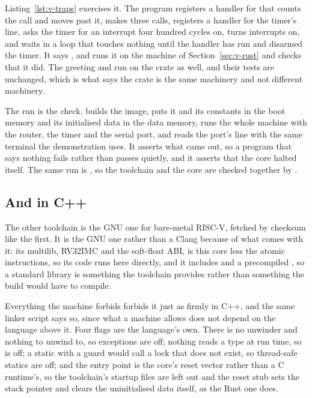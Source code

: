 \documentclass[journal,onecolumn,9pt]{IEEEtran}
\begin{document}
Listing~\ref{lst:v-traps} exercises it. The program registers a
handler for  that counts the call and moves 
past it, makes three calls, registers a handler for the timer's line,
asks the timer for an interrupt four hundred cycles on, turns
interrupts on, and waits in a loop that touches nothing until the
handler has run and disarmed the timer. It says
, and  runs it
on the machine of Section~\ref{sec:v-rust} and checks that it did.
The greeting and  run on the crate as well, and their
tests are unchanged, which is what says the crate is the same
machinery and not different machinery.



The run is the check.  builds the image,
puts it and its constants in the boot memory and its initialised data
in the data memory, runs the whole machine with the router, the timer and
the serial port, and reads the port's line with the same terminal the
demonstration uses. It asserts what came out, so a program that says
nothing fails rather than passes quietly, and it asserts that the
core halted itself. The same run is ,
so the toolchain and the core are checked together by
.

\subsection*{And in C++}

The other toolchain is the GNU one for bare-metal RISC-V, fetched by
checksum like the first. It is the GNU one rather than a Clang
because of what comes with it: its  multilib,
RV32IMC and the soft-float ABI, is this core less the atomic
instructions, so its code runs here directly, and it includes
 and a precompiled ,
so a standard library is something the
toolchain provides rather than something the build would have to compile.

Everything the machine forbids forbids it just as firmly in C++, and
the same linker script says so, since what a machine allows does not
depend on the language above it. Four flags are the language's own.
There is no unwinder and nothing to unwind to, so exceptions are off;
nothing reads a type at run time, so  is off; a static
with a guard would call a lock that does not exist, so thread-safe
statics are off; and the entry point is the core's reset vector
rather than a C runtime's, so the toolchain's startup files are left
out and the reset stub sets the stack pointer and clears the
uninitialised data itself, as the Rust one does.
\end{document}
